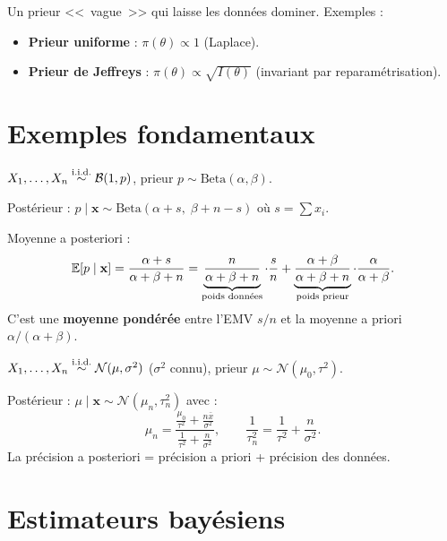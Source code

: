 \begin{definition}
Un prieur <<~vague~>> qui laisse les donn\'ees dominer. Exemples :
\begin{itemize}
\item \textbf{Prieur uniforme} : $\pi(\theta)\propto 1$ (Laplace).
\item \textbf{Prieur de Jeffreys} : $\pi(\theta)\propto\sqrt{I(\theta)}$ (invariant par reparam\'etrisation).
\end{itemize}
\end{definition}

\section{Exemples fondamentaux}

\begin{exemple}
$X_1,\ldots,X_n\overset{\text{i.i.d.}}{\sim}\mathcal{B}(1,p)$, prieur $p\sim\mathrm{Beta}(\alpha,\beta)$.

Post\'erieur : $p\mid\mathbf{x}\sim\mathrm{Beta}(\alpha+s,\;\beta+n-s)$ o\`u $s=\sum x_i$.

Moyenne a posteriori :
\[
\mathbb{E}[p\mid\mathbf{x}] = \frac{\alpha+s}{\alpha+\beta+n} = \underbrace{\frac{n}{\alpha+\beta+n}}_{\text{poids donn\'ees}}\cdot\frac{s}{n} + \underbrace{\frac{\alpha+\beta}{\alpha+\beta+n}}_{\text{poids prieur}}\cdot\frac{\alpha}{\alpha+\beta}.
\]
C'est une \textbf{moyenne pond\'er\'ee} entre l'EMV $s/n$ et la moyenne a priori $\alpha/(\alpha+\beta)$.
\end{exemple}

\begin{exemple}
$X_1,\ldots,X_n\overset{\text{i.i.d.}}{\sim}\mathcal{N}(\mu,\sigma^2)$ ($\sigma^2$ connu), prieur $\mu\sim\mathcal{N}(\mu_0,\tau^2)$.

Post\'erieur : $\mu\mid\mathbf{x}\sim\mathcal{N}(\mu_n,\tau_n^2)$ avec :
\[
\mu_n = \frac{\frac{\mu_0}{\tau^2}+\frac{n\bar{x}}{\sigma^2}}{\frac{1}{\tau^2}+\frac{n}{\sigma^2}}, \qquad \frac{1}{\tau_n^2}=\frac{1}{\tau^2}+\frac{n}{\sigma^2}.
\]
La pr\'ecision a posteriori = pr\'ecision a priori + pr\'ecision des donn\'ees.
\end{exemple}

\section{Estimateurs bay\'esiens}

